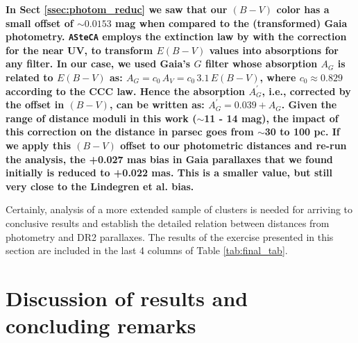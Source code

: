\documentclass[referee]{aa}
\begin{document}

\textbf{In Sect \ref{ssec:photom_reduc} we saw that our $(B-V)$ color has a small
offset of $\sim0.0153$ mag when compared to the (transformed) Gaia photometry.
\texttt{ASteCA} employs the extinction law by \citet[][CCC law]{Cardelli_1989}
with the \citet{Odonnell_1994} correction for the near UV, to transform $E
(B-V)$ values into absorptions for any filter.
In our case, we used Gaia's $G$ filter whose absorption $A_G$ is related to $E
(B-V)$ as: $A_G = c_0 \, A_V  = c_0 \, 3.1 \, E(B-V)$, where $c_0\approx0.829$
according to the CCC law. Hence the absorption $A_{G}^{\prime}$, i.e.,
corrected by the offset in $(B-V)$, can be written as: $A_{G}^
{\prime}=0.039+A_G$.
Given the range of distance moduli in this work ($\sim$11 - 14 mag), the impact
of this correction on the distance in parsec goes from $\sim$30 to 100 pc.
If we apply this $(B-V)$ offset to our photometric distances and re-run the
analysis, the +0.027 mas bias in Gaia parallaxes that we found
initially is reduced to +0.022 mas. This is a smaller value, but still very
close to the Lindegren et al. bias.
}

Certainly, analysis of a more extended sample of clusters is needed for
arriving to conclusive results and establish the detailed relation between
distances from photometry and DR2 parallaxes. The results of the exercise
presented in this section are included in the last 4 columns of Table 
\ref{tab:final_tab}.




\section{Discussion of results and concluding remarks}
\label{sec:results_concl}
\end{document}
